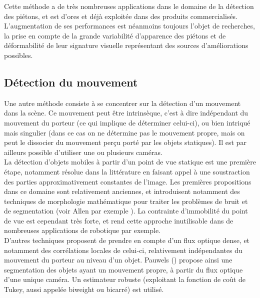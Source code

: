 Cette méthode a de très nombreuses applications dans le domaine de la détection des piétons, et est d'ores et déjà exploitée dans des produits commercialisés. L'augmentation de ses performances est néanmoins toujours l'objet de recherches, la prise en compte de la grande variabilité d'apparence des piétons et de déformabilité de leur signature visuelle représentant des sources d'améliorations possibles.

\subsection{Détection du mouvement}
Une autre méthode consiste à se concentrer sur la détection d'un mouvement dans la scène. Ce mouvement peut être intrinsèque, c'est à dire indépendant du mouvement du porteur (ce qui implique de déterminer celui-ci), ou bien intriqué mais singulier (dans ce cas on ne détermine pas le mouvement propre, mais on peut le dissocier du mouvement perçu porté par les objets statiques). Il est par ailleurs possible d'utiliser une ou plusieurs caméras. \\

La détection d'objets mobiles à partir d'un point de vue statique est une première étape, notamment résolue dans la littérature en faisant appel à une soustraction des parties approximativement constantes de l'image. Les premières propositions dans ce domaine sont relativement anciennes, et introduisent notamment des techniques de morphologie mathématique pour traiter les problèmes de bruit et de segmentation (voir Allen par exemple \cite{Allen1994}). La contrainte d'immobilité du point de vue est cependant très forte, et rend cette approche inutilisable dans de nombreuses applications de robotique par exemple. \\

D'autres techniques proposent de prendre en compte d'un flux optique dense, et notamment des corrélations locales de celui-ci, relativement indépendantes du mouvement du porteur au niveau d'un objet. Pauwels (\cite{Pauwels2004}) propose ainsi une segmentation des objets ayant un mouvement propre, à partir du flux optique d'une unique caméra. Un estimateur robuste (exploitant la fonction de coût de Tukey, aussi appelée \og biweight\fg{} ou bicarré) est utilisé. \\

